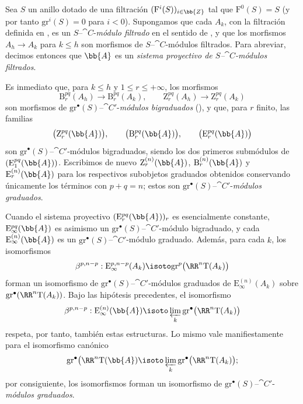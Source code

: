 \documentclass[oneside]{amsart}
\renewcommand{\leq}{\leqslant}
\let\EGAOriginalLabel\label
\renewcommand{\label}[1]{\phantomsection\EGAOriginalLabel{#1}}
\begin{document}
\begin{env}[13.7.6]
\label{0.13.7.6}
Sea $S$ un anillo dotado de una filtración
$(\mathrm{F}^i(S))_{i\in\bb{Z}}$ tal que
$\mathrm{F}^0(S)=S$ (y por tanto
$\mathrm{gr}^i(S)=0$ para $i<0$).
Supongamos que cada $A_k$, con la filtración definida en
, es un
$S$--$\cat{C}$-\emph{módulo filtrado} en el sentido de , y que los
morfismos $A_h\longrightarrow A_k$ para $k\leq h$ son morfismos de
$S$--$\cat{C}$-módulos filtrados.
Para abreviar, decimos entonces que $\bb{A}$ es un
\emph{sistema proyectivo de $S$--$\cat{C}$-módulos filtrados}.

Es inmediato que, para $k\leq h$ y
$1\leq r\leq+\infty$, los morfismos
\[
  \mathrm{B}_r^{pq}(A_h)\longrightarrow\mathrm{B}_r^{pq}(A_k),
  \qquad
  \mathrm{Z}_r^{pq}(A_h)\longrightarrow\mathrm{Z}_r^{pq}(A_k)
\]
son morfismos de
$\mathrm{gr}^\bullet(S)$--$\cat{C}'$-\emph{módulos bigraduados}
(), y que, para $r$ finito, las familias
\[
  \bigl(\mathrm{Z}_r^{pq}(\bb{A})\bigr),\qquad
  \bigl(\mathrm{B}_r^{pq}(\bb{A})\bigr),\qquad
  \bigl(\mathrm{E}_r^{pq}(\bb{A})\bigr)
\]
son $\mathrm{gr}^\bullet(S)$--$\cat{C}'$-módulos
bigraduados, siendo los dos primeros submódulos de
$(\mathrm{E}_1^{pq}(\bb{A}))$.
Escribimos de nuevo
$\mathrm{Z}_r^{(n)}(\bb{A})$,
$\mathrm{B}_r^{(n)}(\bb{A})$ y
$\mathrm{E}_r^{(n)}(\bb{A})$ para los respectivos subobjetos graduados
obtenidos conservando únicamente los términos con $p+q=n$; estos son
$\mathrm{gr}^\bullet(S)$--$\cat{C}'$-\emph{módulos graduados}.

Cuando el sistema proyectivo
$(\mathrm{E}_r^{pq}(\bb{A}))_r$ es esencialmente constante,
$\mathrm{E}_\infty^{pq}(\bb{A})$ es asimismo un
$\mathrm{gr}^\bullet(S)$--$\cat{C}'$-módulo bigraduado, y cada
$\mathrm{E}_\infty^{(n)}(\bb{A})$ es un
$\mathrm{gr}^\bullet(S)$--$\cat{C}'$-módulo graduado.
Además, para cada $k$, los isomorfismos
\[
  \beta^{p,n-p}:
  \mathrm{E}_\infty^{p,n-p}(A_k)
  \isoto
  \mathrm{gr}^p\bigl(\RR^n\mathrm{T}(A_k)\bigr)
\]
forman un isomorfismo de
$\mathrm{gr}^\bullet(S)$--$\cat{C}'$-módulos graduados de
$\mathrm{E}_\infty^{(n)}(A_k)$ sobre
$\mathrm{gr}^\bullet(\RR^n\mathrm{T}(A_k))$.
Bajo las hipótesis precedentes, el isomorfismo
\[
  \beta^{p,n-p}:
  \mathrm{E}_\infty^{(n)}(\bb{A})
  \isoto
  \varprojlim_k
  \mathrm{gr}^\bullet\bigl(\RR^n\mathrm{T}(A_k)\bigr)
\]
respeta, por tanto, también estas estructuras.
Lo mismo vale manifiestamente para el isomorfismo canónico
\[
  \mathrm{gr}^\bullet\bigl(\RR^n\mathrm{T}(\bb{A})
  \isoto
  \varprojlim_k
  \mathrm{gr}^\bullet\bigl(\RR^n\mathrm{T}(A_k)\bigr);
\]
por consiguiente, los isomorfismos  forman un
isomorfismo de
$\mathrm{gr}^\bullet(S)$--$\cat{C}'$-\emph{módulos graduados}.
\end{env}
\end{document}
